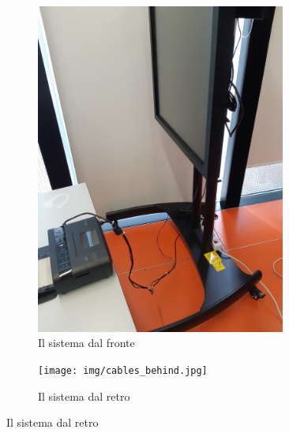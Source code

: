\documentclass[12pt]{article}
\begin{document}
    \begin{figure}[H]
		\begin{subfigure}{0.5\textwidth}
                \includegraphics[width=0.9\textwidth]{img/stand_full.jpg}
                \caption*{Il sistema dal fronte}
        \end{subfigure}
		\begin{subfigure}{0.5\textwidth}
                \texttt{[image: img/cables\_behind.jpg]}
                \caption*{Il sistema dal retro}
        \end{subfigure}
    \end{figure}
		
\end{document}
